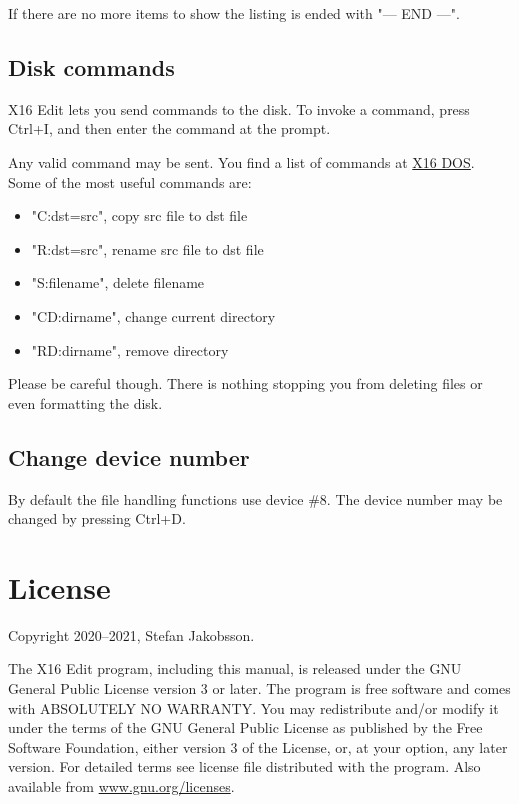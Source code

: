 \documentclass{article}
\begin{document}
    If there are no more items to show the listing is ended with "--- END ---".


    \subsection{Disk commands}

    X16 Edit lets you send commands to the disk. To invoke a command, press Ctrl+I, and then enter
    the command at the prompt.

    Any valid command may be sent. You find a list of commands at 
    \href{https://github.com/commanderx16/x16-rom/tree/master/dos}{X16 DOS}. Some of the most useful commands are:

     \begin{itemize} 
            \item "C:dst=src", copy src file to dst file
            \item "R:dst=src", rename src file to dst file
            \item "S:filename", delete filename
            \item "CD:dirname", change current directory
            \item "RD:dirname", remove directory
    \end{itemize}
    
    Please be careful though. There is nothing stopping you from deleting files or even formatting the
    disk.


    \subsection{Change device number}

    By default the file handling functions use device \#8. The device
    number may be changed by pressing Ctrl+D.


\section{License}

	Copyright 2020--2021, Stefan Jakobsson.

	The X16 Edit program, including this manual, is released under the GNU General Public License version 3 or later.
    The program is free software and comes with ABSOLUTELY NO WARRANTY. You may redistribute and/or modify it under the 
    terms of the GNU General Public License as pub­lished by the Free Software Foundation, either version 3 of the License, 
    or, at your option, any later version. For detailed terms see license file distributed with the program. 
    Also available from \href{https://www.gnu.org/licenses}{www.gnu.org/licenses}.
\end{document}
